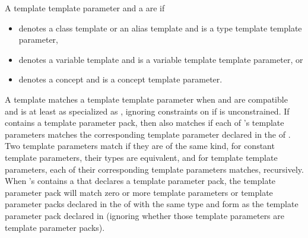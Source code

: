 \pnum
A template template parameter  and
a   are
if
\begin{itemize}
\item
{} denotes a class template or an alias template and
 is a type template template parameter,
\item
{} denotes a variable template and
 is a variable template template parameter, or
\item
{} denotes a concept and
 is a concept template parameter.
\end{itemize}

\pnum
A template   matches a template
template parameter  when
 and  are compatible and
 is at least as specialized as , ignoring constraints
on  if  is unconstrained.
If  contains a template parameter pack, then  also matches 
if each of 's template parameters
matches the corresponding template parameter declared in the
 of .
Two template parameters match if they are of the same kind,
for constant template parameters, their types are
equivalent, and for template template parameters,
each of their corresponding template parameters matches, recursively.
When 's  contains a 
that declares a template parameter
pack, the template parameter pack will match zero or more template
parameters or template parameter packs declared in the  of
 with the same type and form as the template parameter pack declared in 
(ignoring whether those template parameters are template parameter packs).

